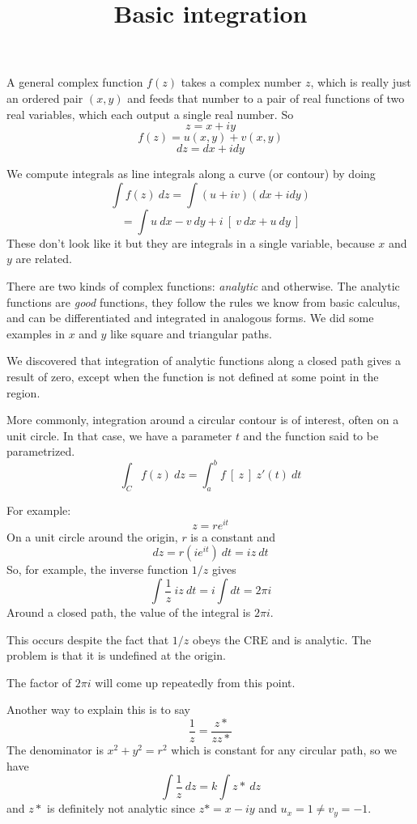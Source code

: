 \documentclass[11pt, oneside]{article}
\title{Basic integration}
\date{}
\begin{document}
\maketitle
\Large


A general complex function $f(z)$ takes a complex number $z$, which is really just an ordered pair $(x,y)$ and feeds that number to a pair of real functions of two real variables, which each output a single real number.  So
\[ z = x + iy \]
\[ f(z) = u(x,y) + v(x,y) \]
\[ dz = dx + i dy \]

We compute integrals as line integrals along a curve (or contour) by doing
\[ \int f(z) \ dz = \int (u + iv)(dx + i dy) \]
\[ = \int u \ dx - v \ dy + i \ [ \ v \ dx + u \ dy \ ] \]
These don't look like it but they are integrals in a single variable, because $x$ and $y$ are related.

There are two kinds of complex functions:  \emph{analytic} and otherwise.  The analytic functions are \emph{good} functions, they follow the rules we know from basic calculus, and can be differentiated and integrated in analogous forms.  We did some examples in $x$ and $y$ like square and triangular paths.

We discovered that integration of analytic functions along a closed path gives a result of zero, except when the function is not defined at some point in the region.

More commonly, integration around a circular contour is of interest, often on a unit circle.  In that case, we have a parameter $t$ and the function said to be parametrized.
\[ \int_C f(z) \ dz = \int_a^b f \ [ \ z \ ] \ z'(t) \ dt \]

For example:
\[ z = r e^{it} \]
On a unit circle around the origin, $r$ is a constant and
\[ dz = r(i e^{it}) \ dt = iz \ dt \]
So, for example, the inverse function $1/z$ gives
\[ \int \frac{1}{z} \ iz \ dt = i \int dt = 2 \pi i \]
Around a closed path, the value of the integral is $2 \pi i$.  

This occurs despite the fact that $1/z$ obeys the CRE and is analytic.  The problem is that it is undefined at the origin.

The factor of $2 \pi i$ will come up repeatedly from this point.

Another way to explain this is to say 
\[ \frac{1}{z} = \frac{z*}{zz*} \]
The denominator is $x^2 + y^2 = r^2$ which is constant for any circular path, so we have
\[ \int \frac{1}{z} \ dz = k \int z* \ dz \]
and $z*$ is definitely not analytic since $z* = x - iy$ and $u_x = 1 \ne v_y = -1$.
\end{document}
